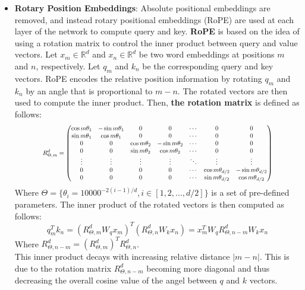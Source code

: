 \documentclass{article}
\newcommand\scalemath[2]{\scalebox{#1}{\mbox{\ensuremath{\displaystyle #2}}}}
\begin{document}
\begin{itemize}
			\item 
				\textbf{Rotary Position Embeddings}: Absolute positional embeddings are removed, and instead rotary positional embeddings (RoPE) are used at each layer of the network to compute query and key. \textbf{RoPE} is based on the idea of using a rotation matrix to control the inner product between query and value vectors.
				Let $x_m \in \mathbb{R}^d$ and $x_n \in \mathbb{R}^d$ be two word embeddings at positions $m$ and $n$, respectively. Let $q_m$ and $k_n$ be the corresponding query and key vectors. RoPE encodes the relative position information by rotating $q_m$ and $k_n$ by an angle that is proportional to $m-n$. The rotated vectors are then used to compute the inner product. Then, \textbf{the rotation matrix} is defined as follows: 
				\begin{equation}
					\scalemath{0.75}{
						R^d_{\Theta,m} = 
						\begin{pmatrix}
							\cos{m\theta_1}& -\sin{m\theta_1}&0&0&\cdots&0&0\\
							\sin{m\theta_1}&\cos{m\theta_1}&0&0&\cdots&0&0 \\
							0&0&\cos{m\theta_2}& -\sin{m\theta_2}&\cdots&0&0\\
							0&0&\sin{m\theta_2}&\cos{m\theta_2}&\cdots&0&0 \\
							\vdots&\vdots&\vdots&\vdots&\ddots&\vdots&\vdots\\
							0&0&0&0&\cdots&\cos{m\theta_{d/2}}& -\sin{m\theta_{d/2}}\\
							0&0&0&0&\cdots&\sin{m\theta_{d/2}}&\cos{m\theta_{d/2}}
						\end{pmatrix}
					}
					\label{fn:rope-RMat}
				\end{equation}
				Where $\Theta = \{\theta_i = 10000^{-2(i-1)/d}, i \in [1, 2, ..., d/2]\}$ is a set of pre-defined parameters.
				The inner product of the rotated vectors is then computed as follows:
				\begin{equation}
					q_m^T k_n = (R_{\Theta,m}^{d} W_q x_m)^T (R_{\Theta,n}^{d} W_k x_n) = x_m^T W_q R_{\Theta,n-m}^{d} W_k x_n
					\label{q_k_inner_product}
				\end{equation}
				Where $R_{\Theta,n-m}^{d} = (R_{\Theta,m}^{d})^T R_{\Theta,n}^{d}$. \\
				This inner product decays with increasing relative distance $|m - n|$. This is due to the rotation matrix $R_{\Theta,n-m}^{d}$ becoming more diagonal and thus decreasing the overall cosine value of the angel between $q$ and $k$ vectors.
				
				
		\end{itemize}
		
\end{document}
